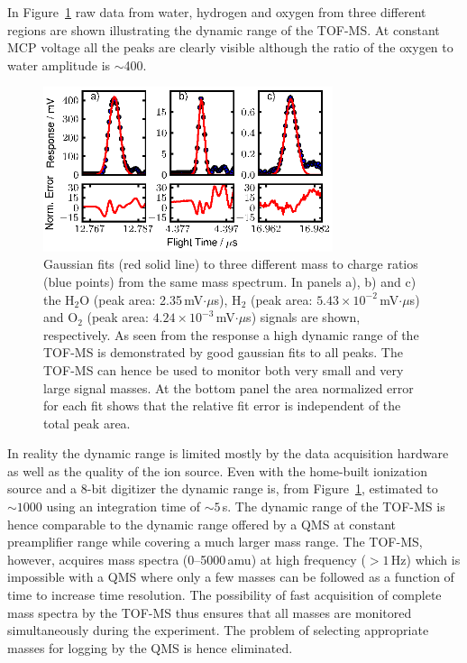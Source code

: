 \documentclass[aip,rsi]{revtex4-1}
\begin{document}
In Figure~\ref{fig:dynamic_range} raw data from water, hydrogen and oxygen from three different regions are shown illustrating the dynamic range of the TOF-MS. At constant MCP voltage all the peaks are clearly visible although the ratio of the oxygen to water amplitude is $\sim$400. 
\begin{figure}
 \includegraphics[width=8.5cm]{dynamic_range.eps}
 \caption{Gaussian fits (red solid line) to three different mass to charge
 ratios (blue points) from the same mass spectrum. In panels a), b) and c) the H$_2$O (peak area: 2.35\,mV$\cdot\mu$s), H$_2$ (peak area: $5.43\times10^{-2}$\,mV$\cdot\mu$s) and O$_2$ (peak area: $4.24\times10^{-3}$\,mV$\cdot\mu$s) signals are shown, respectively. As seen from the
 response a high dynamic range of the TOF-MS is demonstrated by good gaussian
 fits to all peaks. The TOF-MS can hence be used to monitor both very small and
 very large signal masses. At the bottom panel the area normalized error for
 each fit shows that the relative fit error is independent of the total peak
 area.\label{fig:dynamic_range}}

\end{figure}
In reality the dynamic range is limited mostly by the data acquisition hardware as well as the quality of the ion source. Even with the home-built ionization source and a 8-bit digitizer the dynamic range is, from Figure~\ref{fig:dynamic_range}, estimated to $\sim1000$ using an integration time of $\sim5$\,s. The dynamic range of the TOF-MS is hence comparable to the dynamic range offered by a QMS at constant preamplifier range while covering a much larger mass range. The TOF-MS, however, acquires mass spectra (\mbox{0--5000}\,amu) at high frequency ($>1$\,Hz) which is impossible with a QMS where only a few masses can be followed as a function of time to increase time resolution. The possibility of fast acquisition of complete mass spectra by the TOF-MS thus ensures that all masses are monitored simultaneously during the experiment. The problem of selecting appropriate masses for logging by the QMS is hence eliminated.
\end{document}
